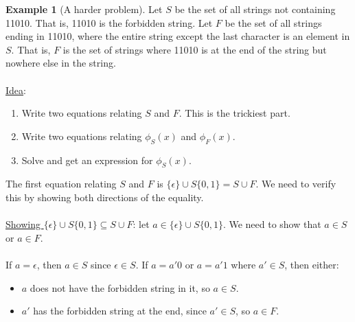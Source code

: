 \documentclass[]{article}
\theoremstyle{definition}
\newtheorem{ex}{Example}[section]
\begin{document}
				\begin{ex}[A harder problem]
					Let $S$ be the set of all strings not containing 11010. That is, 11010 is the forbidden string. Let $F$ be the set of all strings ending in 11010, where the entire string except the last character is an element in $S$. That is, $F$ is the set of strings where 11010 is at the end of the string but nowhere else in the string.
					\\ \\
					\underline{Idea}:
					\begin{enumerate}
						\item Write two equations relating $S$ and $F$. This is the trickiest part.
						\item Write two equations relating $\phi_S(x)$ and $\phi_F(x)$.
						\item Solve and get an expression for $\phi_S(x)$.
					\end{enumerate}

					The first equation relating $S$ and $F$ is $\{ \epsilon \} \cup S \{ 0, 1 \} = S \cup F$. We need to verify this by showing both directions of the equality.
					\\ \\
					\underline{Showing $\{\epsilon \} \cup S \{ 0, 1 \} \subseteq S \cup F$}: let $a \in \{ \epsilon \} \cup S \{ 0, 1 \}$. We need to show that $a \in S$ or $a \in F$.
					\\ \\
					If $a = \epsilon$, then $a \in S$ since $\epsilon \in S$. If $a = a'0$ or $a = a'1$ where $a' \in S$, then either:
					\begin{itemize}
						\item $a$ does not have the forbidden string in it, so $a \in S$.
						\item $a'$ has the forbidden string at the end, since $a' \in S$, so $a \in F$.
					\end{itemize}


\end{ex}
\end{document}
